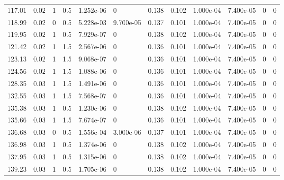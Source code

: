 \documentclass[preview]{standalone}
\begin{document}
{{\begin{tabular}{L{1.2cm}C{1.2cm} C{0.3cm}C{0.5cm} C{1.4cm}C{1.4cm} C{1.4cm}C{1.4cm} C{1.6cm}C{1.6cm} C{1.6cm}C{1.6cm}}
  117.01  &  0.02  & 1     & 0.5 &  1.252e-06  & 0  &  0.138&   0.102& 1.000e-04 & 7.400e-05   &  0 & 0  \\ 
  118.99  &  0.02  & 0     & 0.5 &  5.228e-03  & 9.700e-05  &  0.137&   0.101& 1.000e-04 & 7.400e-05   &  0 & 0  \\ 
  119.95  &  0.02  & 1     & 0.5 &  7.929e-07  & 0  &  0.138&   0.102& 1.000e-04 & 7.400e-05   &  0 & 0  \\ 
  121.42  &  0.02  & 1     & 1.5 &  2.567e-06  & 0  &  0.136&   0.101& 1.000e-04 & 7.400e-05   &  0 & 0  \\ 
  123.13  &  0.02  & 1     & 1.5 &  9.068e-07  & 0  &  0.136&   0.101& 1.000e-04 & 7.400e-05   &  0 & 0  \\ 
  124.56  &  0.02  & 1     & 1.5 &  1.088e-06  & 0  &  0.136&   0.101& 1.000e-04 & 7.400e-05   &  0 & 0  \\ 
  128.35  &  0.03  & 1     & 1.5 &  1.491e-06  & 0  &  0.136&   0.101& 1.000e-04 & 7.400e-05   &  0 & 0  \\ 
  132.55  &  0.03  & 1     & 1.5 &  7.568e-07  & 0  &  0.136&   0.101& 1.000e-04 & 7.400e-05   &  0 & 0  \\ 
  135.38  &  0.03  & 1     & 0.5 &  1.230e-06  & 0  &  0.138&   0.102& 1.000e-04 & 7.400e-05   &  0 & 0  \\ 
  135.66  &  0.03  & 1     & 1.5 &  7.674e-07  & 0  &  0.136&   0.101& 1.000e-04 & 7.400e-05   &  0 & 0  \\ 
  136.68  &  0.03  & 0     & 0.5 &  1.556e-04  & 3.000e-06  &  0.137&   0.101& 1.000e-04 & 7.400e-05   &  0 & 0  \\ 
  136.98  &  0.03  & 1     & 0.5 &  1.374e-06  & 0  &  0.138&   0.102& 1.000e-04 & 7.400e-05   &  0 & 0  \\ 
  137.95  &  0.03  & 1     & 0.5 &  1.315e-06  & 0  &  0.138&   0.102& 1.000e-04 & 7.400e-05   &  0 & 0  \\ 
  139.23  &  0.03  & 1     & 0.5 &  1.705e-06  & 0  &  0.138&   0.102& 1.000e-04 & 7.400e-05   &  0 & 0  \\ 
\hline 
\end{tabular} 

}}
\end{document}
